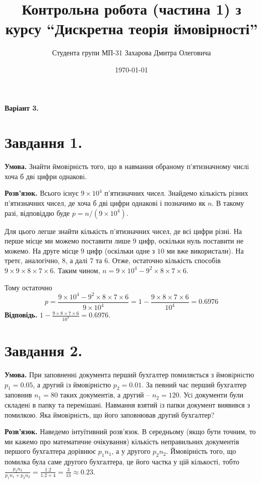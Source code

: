 \documentclass[12pt]{extarticle}
\title{Контрольна робота (частина 1) з курсу ``Дискретна теорія ймовірності''}
\author{Студента групи МП-31 Захарова Дмитра Олеговича}
\date{\today}
\begin{document}
\maketitle

\textbf{Варіант 3.}

\section*{Завдання 1.} 

\textbf{Умова.} Знайти ймовiрнiсть того, що в навмання обраному п’ятизначному числi хоча б двi цифри
однаковi.

\textbf{Розв'язок.} Всього існує $9 \times 10^4$ п'ятизначних чисел. Знайдемо кількість різних п'ятизначних чисел, де хоча б дві цифри однакові і позначимо як $n$. В такому разі, відповіддю буде $p=n/(9 \times 10^4)$. 

Для цього легше знайти кількість п'ятизначних чисел, де всі цифри різні. На перше місце ми можемо поставити лише $9$ цифр, оскільки нуль поставити не можемо. На друге місце $9$ цифр (оскільки одне з $10$ ми вже використали). На третє, аналогічно, $8$, а далі $7$ та $6$. Отже, остаточно кількість способів $9 \times 9 \times 8 \times 7 \times 6$. Таким чином, $n = 9 \times 10^4 - 9^2 \times 8 \times 7 \times 6$. 

Тому остаточно
\[
p = \frac{9 \times 10^4 - 9^2 \times 8 \times 7 \times 6}{9 \times 10^4} = 1 - \frac{9 \times 8 \times 7 \times 6}{10^4} = 0.6976
\]
\textbf{Відповідь.} $1 - \frac{9\times 8 \times 7 \times 6}{10^4} = 0.6976$. 

\pagebreak

\section*{Завдання 2.}

\textbf{Умова.} При заповненнi документа перший бухгалтер помиляється з ймовiрнiстю $p_1=0.05$, а другий
iз ймовiрнiстю $p_2=0.01$. За певний час перший бухгалтер заповнив $n_1=80$ таких документiв,
а другий -- $n_2=120$. Усi документи були складенi в папку та перемiшанi. Навмання взятий
iз папки документ виявився з помилкою. Яка ймовiрнiсть, що його заповнював другий бухгалтер?

\textbf{Розв'язок.} Наведемо інтуїтивний розв'язок. В середньому (якщо бути точним, то ми кажемо про математичне очікування) кількість неправильних документів першого бухгалтера дорівнює $p_1n_1$, а у другого $p_2n_2$. Ймовірність того, що помилка була саме другого бухгалтера, це його частка у цій кількості, тобто $\frac{p_2n_2}{p_1n_1+p_2n_2} = \frac{1.2}{1.2+4}= \frac{3}{13}\approx 0.23$. 
\end{document}
